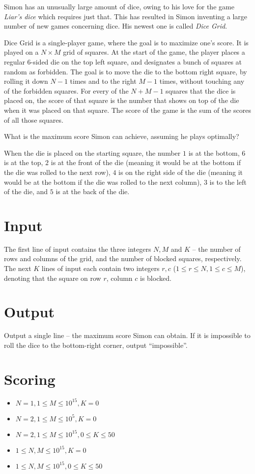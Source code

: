 Simon has an unusually large amount of dice, owing to his love for the game \emph{Liar's dice} which requires just that.
This has resulted in Simon inventing a large number of new games concerning dice.
His newest one is called \emph{Dice Grid}.

Dice Grid is a single-player game, where the goal is to maximize one's score.
It is played on a $N \times M$ grid of squares.
At the start of the game, the player places a regular 6-sided die on the top left square,
and designates a bunch of squares at random as forbidden.
The goal is to move the die to the bottom right square, by rolling it down $N-1$ times and to the right $M-1$ times, without touching any of the forbidden squares.
For every of the $N + M - 1$ squares that the dice is placed on, the score of that square is the number that shows on top of the die when it was placed on that square.
The score of the game is the sum of the scores of all those squares.

What is the maximum score Simon can achieve, assuming he plays optimally?

When the die is placed on the starting square, the number $1$ is at the bottom, $6$ is at the top, $2$ is at the front of the die (meaning it would be at the bottom if the die was rolled to the next row), $4$ is on the right side of the die (meaning it would be at the bottom if the die was rolled to the next column), $3$ is to the left of the die, and $5$ is at the back of the die.

\section*{Input}
The first line of input contains the three integers $N, M$ and $K$ -- the number of rows and columns of the grid, and the number of blocked squares, respectively.
The next $K$ lines of input each contain two integers $r, c$ ($1 \le r \le N, 1 \le c \le M$), denoting that the square on row $r$, column $c$ is blocked.

\section*{Output}
Output a single line -- the maximum score Simon can obtain.
If it is impossible to roll the dice to the bottom-right corner, output ``impossible''.

\section*{Scoring}
\begin{itemize}
  \item $N = 1, 1 \le M \le 10^{15}, K = 0$
  \item $N = 2, 1 \le M \le 10^5, K = 0$
  \item $N = 2, 1 \le M \le 10^{15}, 0 \le K \le 50$
  \item $1 \le N, M \le 10^{15}, K = 0$
  \item $1 \le N, M \le 10^{15}, 0 \le K \le 50$
\end{itemize}
